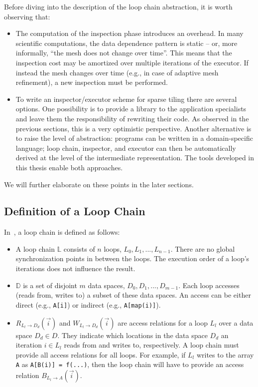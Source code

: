 Before diving into the description of the loop chain abstraction, it is worth observing that:
\begin{itemize}
\item The computation of the inspection phase introduces an overhead. In many scientific computations, the data dependence pattern is static -- or, more informally, ``the mesh does not change over time''. This means that the inspection cost may be amortized over multiple iterations of the executor. If instead the mesh changes over time (e.g., in case of adaptive mesh refinement), a new inspection must be performed. 
\item To write an inspector/executor scheme for sparse tiling there are several options. One possibility is to provide a library to the application specialists and leave them the responsibility of rewriting their code. As observed in the previous sections, this is a very optimistic perspective. Another alternative is to raise the level of abstraction: programs can be written in a domain-specific language; loop chain, inspector, and executor can then be automatically derived at the level of the intermediate representation. The tools developed in this thesis enable both approaches.
\end{itemize}
We will further elaborate on these points in the later sections. 

\subsection{Definition of a Loop Chain}
In~\cite{ST-KriegerHIPS2013}, a loop chain is defined as follows:
\begin{itemize}
\item A loop chain $\mathbb{L}$ consists of $n$ loops, $L_0, L_1, ..., L_{n-1}$. There are no global synchronization points in between the loops. The execution order of a loop's iterations does not influence the result.
\item $\mathbb{D}$ is a set of disjoint $m$ data spaces, $D_0, D_1, ..., D_{m-1}$. Each loop accesses (reads from, writes to) a subset of these data spaces. An access can be either direct (e.g., \texttt{A[i]}) or indirect (e.g., \texttt{A[map(i)]}).
\item $R_{L_l\rightarrow D_d}(\vec{i})$ and $W_{L_l\rightarrow D_d}(\vec{i})$ are access relations for a loop $L_l$ over a data space $D_d \in D$. They indicate which locations in the data space $D_d$ an iteration $i \in L_l$ reads from and writes to, respectively. A loop chain must provide all access relations for all loops. For example, if $L_l$ writes to the array {\tt A} as {\tt A[B(i)] = f(...)}, then the loop chain will have to provide an access relation $B_{L_l\rightarrow A}(\vec{i})$. 
\end{itemize}

